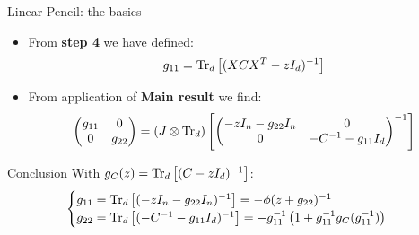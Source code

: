 \documentclass[10pt]{beamer}
\begin{document}
\begin{frame}{Linear Pencil: the basics}
  \begin{itemize}
    \item From \textbf{step 4} we have defined:
    \begin{equation}
      g_{11} = \traceLim[d]{ (XCX^T - zI_d)^{-1}}
    \end{equation}
    \item From application of \textbf{Main result} we find:
    \begin{equation*}
      \begin{pmatrix}
        g_{11} & 0\\
        0 & g_{22}
      \end{pmatrix}
      = \traceLimOp[d]{
        \begin{pmatrix}
          -zI_n - g_{22} I_n & 0\\
          0 & -C^{-1} - g_{11} I_d
        \end{pmatrix}^{-1}
      }
      \end{equation*}
  \end{itemize}



  \begin{alertblock}{Conclusion}
    With $g_C(z) = \traceLim[d]{ (C - zI_d)^{-1}}$:
    \begin{equation*}
      \begin{cases}
        g_{11} = \traceLim[d]{ (-zI_n - g_{22}I_n)^{-1} } = -\phi (z + g_{22})^{-1}\\
        g_{22} = \traceLim[d]{ (-C^{-1} - g_{11}I_d)^{-1} }
        = - g_{11}^{-1} \left( 
          1+ g_{11}^{-1} g_C(g_{11}^{-1})
          \right) 
      \end{cases}
    \end{equation*}
  \end{alertblock}

\end{frame}
\end{document}
